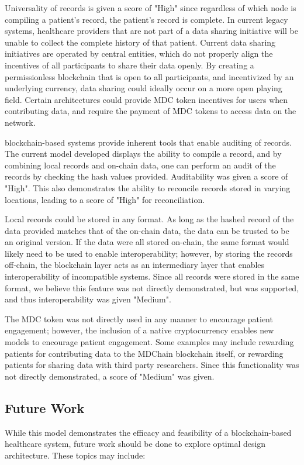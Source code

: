 \documentclass[12pt]{report}
\begin{document}
Universality of records is given a score of "High" since regardless of which node is compiling a patient's record, the patient's record is complete. In current legacy systems, healthcare providers that are not part of a data sharing initiative will be unable to collect the complete history of that patient. Current data sharing initiatives are operated by central entities, which do not properly align the incentives of all participants to share their data openly. By creating a permissionless blockchain that is open to all participants, and incentivized by an underlying currency, data sharing could ideally occur on a more open playing field. Certain architectures could provide MDC token incentives for users when contributing data, and require the payment of MDC tokens to access data on the network.

blockchain-based systems provide inherent tools that enable auditing of records. The current model developed displays the ability to compile a record, and by combining local records and on-chain data, one can perform an audit of the records by checking the hash values provided. Auditability was given a score of "High". This also demonstrates the ability to reconcile records stored in varying locations, leading to a score of "High" for reconciliation.

Local records could be stored in any format. As long as the hashed record of the data provided matches that of the on-chain data, the data can be trusted to be an original version. If the data were all stored on-chain, the same format would likely need to be used to enable interoperability; however, by storing the records off-chain, the blockchain layer acts as an intermediary layer that enables interoperability of incompatible systems. Since all records were stored in the same format, we believe this feature was not directly demonstrated, but was supported, and thus interoperability was given "Medium".

The MDC token was not directly used in any manner to encourage patient engagement; however, the inclusion of a native cryptocurrency enables new models to encourage patient engagement. Some examples may include rewarding patients for contributing data to the MDChain blockchain itself,  or rewarding patients for sharing data with third party researchers. Since this functionality was not directly demonstrated, a score of "Medium" was given.

\subsection{Future Work}
\label{sec:rxfuture}
While this model demonstrates the efficacy and feasibility of a blockchain-based healthcare system, future work should be done to explore optimal design architecture. These topics may include:
\end{document}
